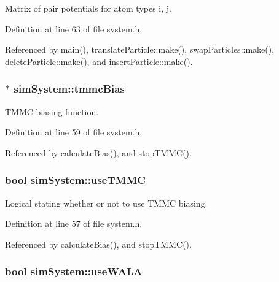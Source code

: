 Matrix of pair potentials for atom types i, j. 



Definition at line 63 of file system.\+h.



Referenced by main(), translate\+Particle\+::make(), swap\+Particles\+::make(), delete\+Particle\+::make(), and insert\+Particle\+::make().

\hypertarget{classsim_system_a13173f45a1e40a5f5a3552b0ebe15b54}{}
\subsubsection[{tmmc\+Bias}]{$\ast$ sim\+System\+::tmmc\+Bias}\label{classsim_system_a13173f45a1e40a5f5a3552b0ebe15b54}


T\+M\+M\+C biasing function. 



Definition at line 59 of file system.\+h.



Referenced by calculate\+Bias(), and stop\+T\+M\+M\+C().

\hypertarget{classsim_system_aa474a50b6353c8897331b1ab1ce53ab1}{}
\subsubsection[{use\+T\+M\+M\+C}]{\setlength{\rightskip}{0pt plus 5cm}bool sim\+System\+::use\+T\+M\+M\+C}\label{classsim_system_aa474a50b6353c8897331b1ab1ce53ab1}


Logical stating whether or not to use T\+M\+M\+C biasing. 



Definition at line 57 of file system.\+h.



Referenced by calculate\+Bias(), and stop\+T\+M\+M\+C().

\hypertarget{classsim_system_aa83b00006b3919fb6e13f1bdeadece6a}{}
\subsubsection[{use\+W\+A\+L\+A}]{\setlength{\rightskip}{0pt plus 5cm}bool sim\+System\+::use\+W\+A\+L\+A}\label{classsim_system_aa83b00006b3919fb6e13f1bdeadece6a}


